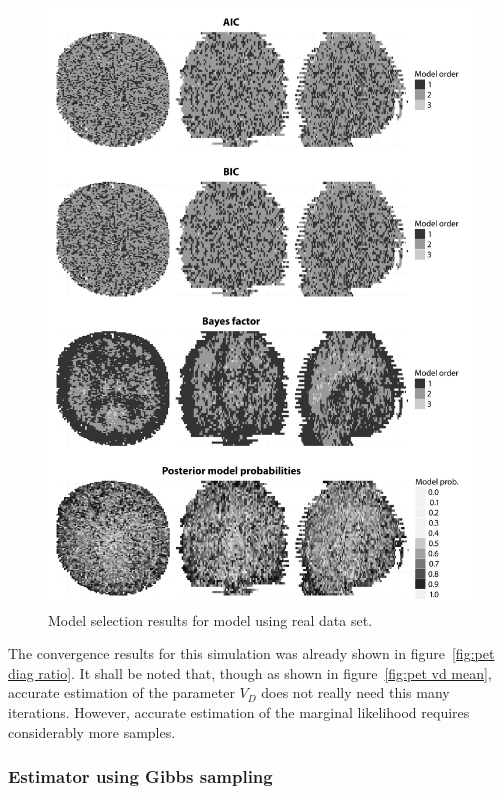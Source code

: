 \begin{figure}
  \includegraphics[width=\linewidth]{fig/PET_MO}
  \caption{Model selection results for \pet model using real data set.}
  \label{fig:pet mo}
\end{figure}

The convergence results for this simulation was already shown in
figure~\ref{fig:pet diag ratio}. It shall be noted that, though as shown in
figure~\ref{fig:pet vd mean}, accurate estimation of the parameter $V_D$ does
not really need this many iterations. However, accurate estimation of the
marginal likelihood requires considerably more samples.

\subsubsection{Estimator using Gibbs sampling}
\label{ssub:Estimator using Gibbs sampling}


